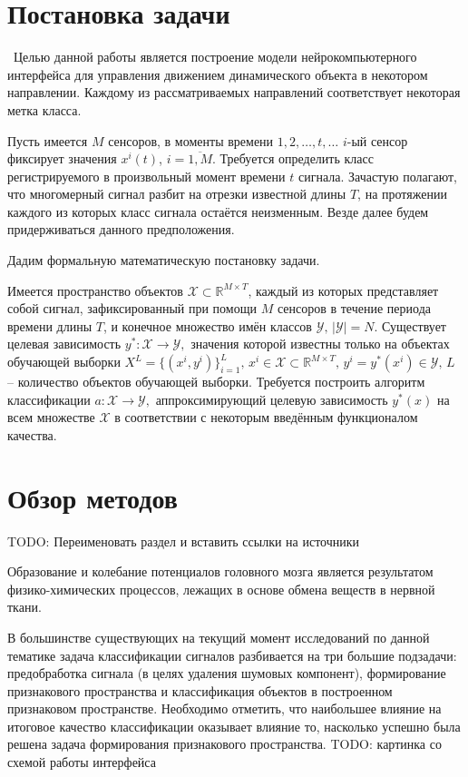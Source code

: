 \documentclass[12pt,fleqn]{article}
\begin{document}
\clearpage 

\section{Постановка задачи}
	\quad\,\,\,Целью данной работы является построение модели нейрокомпьютерного интерфейса для управления движением динамического объекта в некотором направлении. Каждому из рассматриваемых направлений соответствует некоторая метка класса.
 	\par Пусть имеется $M$ сенсоров, в моменты времени $1, 2, \dots, t, \dots$ $i$-ый сенсор фиксирует значения $x^i(t)$, $i = \overline{1,M}.$ Требуется определить класс регистрируемого в произвольный момент времени $t$ сигнала. Зачастую полагают, что многомерный сигнал разбит на отрезки известной длины $T$, на протяжении каждого из которых класс сигнала остаётся неизменным. Везде далее будем придерживаться данного предположения.
	\par Дадим формальную математическую постановку задачи.
	\par Имеется пространство объектов $\mathcal{X} \subset \mathbb{R}^{M \times T}$, каждый из которых представляет собой сигнал, зафиксированный при помощи $M$ сенсоров в течение периода времени длины $T$, и конечное множество имён классов $\mathcal{Y}, \, |\mathcal{Y}| = N$. Существует целевая зависимость $y^*: \mathcal{X} \to \mathcal{Y},$ значения которой известны только на объектах обучающей выборки $X^L = \{ (x^i, y^i)\}_{i=1}^L, \, x^i \in \mathcal{X} \subset \mathbb{R}^{M \times T}, \, y^i = y^*(x^i) \in \mathcal{Y}, \, L$ -- количество объектов обучающей выборки. Требуется построить алгоритм классификации $a: \mathcal{X} \to \mathcal{Y},$ аппроксимирующий целевую зависимость $y^*(x)$ на всем множестве $\mathcal{X}$ в соответствии с некоторым введённым функционалом качества.

\clearpage 

\section{Обзор методов}
	\par TODO: Переименовать раздел и вставить ссылки на источники
	\par Образование и колебание потенциалов головного мозга является результатом физико-химических процессов, лежащих в основе обмена веществ в нервной ткани.
	\par В большинстве существующих на текущий момент исследований по данной тематике задача классификации сигналов разбивается на три большие подзадачи: предобработка сигнала (в целях удаления шумовых компонент), формирование признакового пространства и классификация объектов в построенном признаковом пространстве. Необходимо отметить, что наибольшее влияние на итоговое качество классификации оказывает влияние то, насколько успешно была решена задача формирования признакового пространства. TODO: картинка со схемой работы интерфейса
\end{document}
